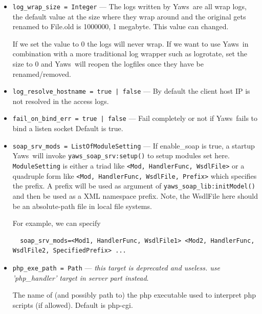 \documentclass[11pt,oneside,english]{book}
\newcommand{\Yaws}            %
        {{\sc Yaws}}
\begin{document}
\begin{itemize}
\item        \verb+log_wrap_size = Integer+ ---
              The logs written by \Yaws\ are all wrap logs, the default value at
              the size where they wrap around and the original gets renamed to
              File.old is 1000000, 1 megabyte. This value can changed.


              If we set the value to 0 the logs will never wrap. If we want to
              use \Yaws\ in combination with a more traditional log wrapper such
              as logrotate, set the size to 0 and \Yaws\ will reopen the
              logfiles once they have be renamed/removed.

\item        \verb+log_resolve_hostname = true | false+ ---
              By default the client host IP is not resolved in the access logs.

\item        \verb+fail_on_bind_err = true | false+ ---
              Fail completely or not if \Yaws\ fails to bind a listen socket
              Default is true.

\item        \verb+soap_srv_mods = ListOfModuleSetting+ ---
              If enable\_soap is true, a startup \Yaws\ will invoke
              \verb+yaws_soap_srv:setup()+ to setup modules set
              here. \verb+ModuleSetting+ is either a triad like
              \verb+<Mod, HandlerFunc, WsdlFile>+ or a quadruple form like
              \verb+<Mod, HandlerFunc, WsdlFile, Prefix>+ which specifies the
              prefix. A prefix will be used as argument of
              \verb+yaws_soap_lib:initModel()+ and then be used as a XML
              namespace prefix.  Note, the WsdlFile here should be an
              absolute-path file in local file systems.

              For example, we can specify
\begin{verbatim}
  soap_srv_mods=<Mod1, HandlerFunc, WsdlFile1> <Mod2, HandlerFunc, WsdlFile2, SpecifiedPrefix> ...
\end{verbatim}

\item        \verb+php_exe_path = Path+ ---
              \textit{this target is deprecated and useless. use 'php\_handler'
                target in server part instead}.

              The name of (and possibly path to) the php executable used to
              interpret php scripts (if allowed).  Default is php-cgi.


\end{itemize}
\end{document}
